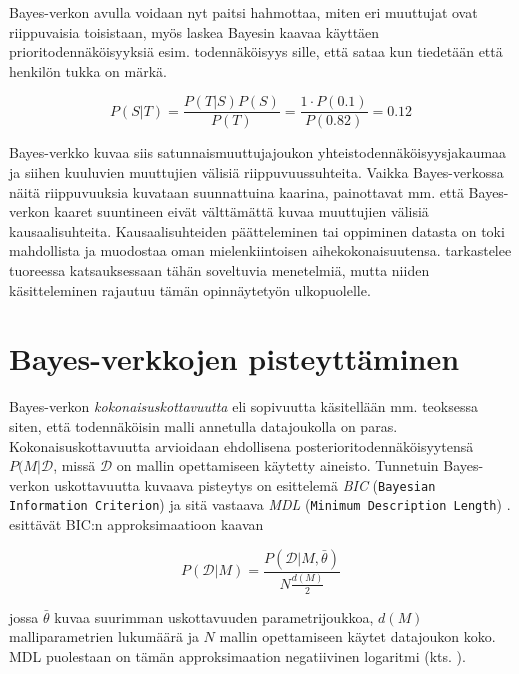 Bayes-verkon avulla voidaan nyt paitsi hahmottaa, miten eri muuttujat ovat riippuvaisia toisistaan, myös laskea Bayesin kaavaa käyttäen prioritodennäköisyyksiä esim. todennäköisyys sille, että sataa kun tiedetään että henkilön tukka on märkä.

$$
  P(S|T) = \frac{P(T|S)P(S)}{P(T)} = \frac{1 \cdot P(0.1)}{P(0.82)} = 0.12   
$$

Bayes-verkko kuvaa siis satunnaismuuttujajoukon yhteistodennäköisyysjakaumaa ja siihen kuuluvien muuttujien välisiä riippuvuussuhteita. Vaikka Bayes-verkossa näitä riippuvuuksia kuvataan suunnattuina kaarina, painottavat mm. \citet{ruggeri_bayesian_2008, myllymaki_bayes-verkkojen_1998} että Bayes-verkon kaaret suuntineen eivät välttämättä kuvaa muuttujien välisiä kausaalisuhteita. Kausaalisuhteiden päätteleminen tai oppiminen datasta on toki mahdollista ja muodostaa oman mielenkiintoisen aihekokonaisuutensa. \citet{vowels_dya_2022} tarkastelee tuoreessa katsauksessaan tähän soveltuvia menetelmiä, mutta niiden käsitteleminen rajautuu tämän opinnäytetyön ulkopuolelle.

\section{Bayes-verkkojen pisteyttäminen}
Bayes-verkon \emph{kokonaisuskottavuutta} eli sopivuutta käsitellään mm. teoksessa \citep{myllymaki_bayes-verkkojen_1998} siten, että todennäköisin malli annetulla datajoukolla on paras. Kokonaisuskottavuutta arvioidaan ehdollisena posterioritodennäköisyytensä $P(M | \mathcal{D}$, missä $\mathcal{D}$ on mallin opettamiseen käytetty aineisto. Tunnetuin Bayes-verkon uskottavuutta kuvaava pisteytys on \citet{schwarz_estimating_1978} esittelemä \emph{BIC} (\texttt{Bayesian Information Criterion}) ja sitä vastaava \emph{MDL} (\texttt{Minimum Description Length}) \citep{ruggeri_bayesian_2008, liu_empirical_2012}. \citet{myllymaki_bayes-verkkojen_1998} esittävät BIC:n approksimaatioon kaavan

$$
P(\mathcal{D}|M) = \frac{P(\mathcal{D}|M, \bar{\theta})}{N{\frac{d(M)}{2}}}
$$

jossa $\bar{\theta}$ kuvaa suurimman uskottavuuden parametrijoukkoa, $d(M)$ malliparametrien lukumäärä ja $N$ mallin opettamiseen käytet datajoukon koko. MDL puolestaan on tämän approksimaation negatiivinen logaritmi (kts. \citet{rissanen_stochastic_1987}).

